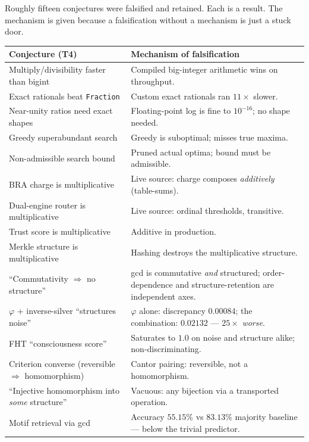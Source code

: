 \documentclass[11pt,a4paper]{article}
\newcommand{\Tf}{\textsf{T4}}
\theoremstyle{definition}
\theoremstyle{plain}
\begin{document}
Roughly fifteen conjectures were falsified and retained. Each is a result. The mechanism is given
because a falsification without a mechanism is just a stuck door.

\begin{longtable}{p{} p{}}
\toprule
\textbf{Conjecture (\Tf)} & \textbf{Mechanism of falsification} \\
\midrule
\endhead
Multiply/divisibility faster than bigint & Compiled big-integer arithmetic wins on throughput. \\
Exact rationals beat \texttt{Fraction} & Custom exact rationals ran $11\times$ slower. \\
Near-unity ratios need exact shapes & Floating-point log is fine to $10^{-16}$; no shape needed. \\
Greedy superabundant search & Greedy is suboptimal; misses true maxima. \\
Non-admissible search bound & Pruned actual optima; bound must be admissible. \\
BRA charge is multiplicative & Live source: charge composes \emph{additively} (table-sums). \\
Dual-engine router is multiplicative & Live source: ordinal thresholds, transitive. \\
Trust score is multiplicative & Additive in production. \\
Merkle structure is multiplicative & Hashing destroys the multiplicative structure. \\
``Commutativity $\Rightarrow$ no structure'' & gcd is commutative \emph{and} structured; order-dependence and structure-retention are independent axes. \\
$\varphi$ + inverse-silver ``structures noise'' & $\varphi$ alone: discrepancy $0.00084$; the combination: $0.02132$ --- $25\times$ \emph{worse}. \\
FHT ``consciousness score'' & Saturates to $1.0$ on noise and structure alike; non-discriminating. \\
Criterion converse (reversible $\Rightarrow$ homomorphism) & Cantor pairing: reversible, not a homomorphism. \\
``Injective homomorphism into \emph{some} structure'' & Vacuous: any bijection via a transported operation. \\
Motif retrieval via gcd & Accuracy $55.15\%$ vs $83.13\%$ majority baseline --- below the trivial predictor. \\
\bottomrule
\end{longtable}
\end{document}
